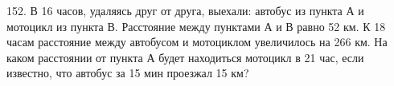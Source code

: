 152. В 16 часов, удаляясь друг от друга, выехали: автобус из пункта А и мотоцикл из пункта В. Расстояние между пунктами А и В равно 52 км. К 18 часам расстояние между автобусом и мотоциклом увеличилось на 266 км. На каком расстоянии от пункта А будет находиться мотоцикл в 21 час, если известно, что автобус за 15 мин проезжал 15 км?\\

